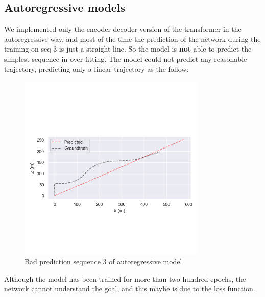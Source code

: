 \subsection{Autoregressive models}\label{subsec:autoregressive-model}
We implemented only the encoder-decoder version of the transformer in the autoregressive way, and most of the time the prediction of the network during the training on seq 3 is just a straight line.
So the model is \textbf{not} able to predict the simplest sequence in over-fitting.
The model could not predict any reasonable trajectory, predicting only a linear trajectory as the follow:
\begin{figure}[H]
    \centering
    \includegraphics[width=0.8\textwidth]{images/6_1_autoregressive_prediction}
    \caption{Bad prediction sequence 3 of autoregressive model}\label{fig:autoregressive-seq-3}
\end{figure}
Although the model has been trained for more than two hundred epochs, the network cannot understand the goal, and this maybe is due to the loss function.